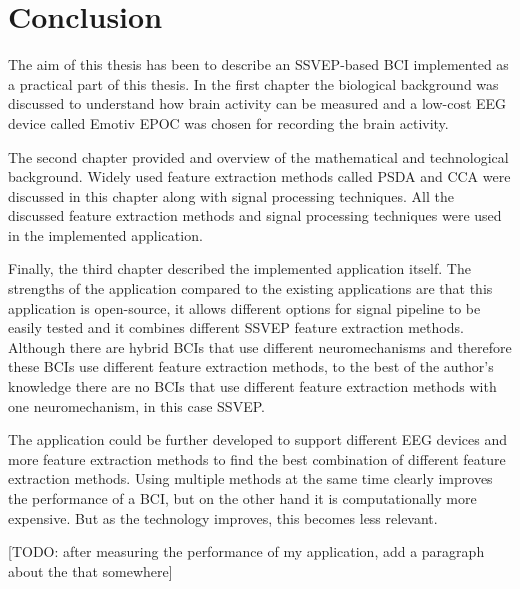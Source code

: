 
\chapter*{Conclusion}

The aim of this thesis has been to describe an \gls{SSVEP}-based \gls{BCI} implemented as a practical part of this thesis. In the first chapter the biological background was discussed to understand how brain activity can be measured and a low-cost \gls{EEG} device called Emotiv EPOC was chosen for recording the brain activity.

The second chapter provided and overview of the mathematical and technological background. Widely used \gls{feature extraction} methods called \gls{PSDA} and \gls{CCA} were discussed in this chapter along with signal processing techniques. All the discussed \gls{feature extraction} methods and signal processing techniques were used in the implemented application.

Finally, the third chapter described the implemented application itself. The strengths of the application compared to the existing applications are that this application is open-source, it allows different options for signal pipeline to be easily tested and it combines different \gls{SSVEP} \gls{feature extraction} methods. Although there are hybrid \glspl{BCI} that use different neuromechanisms and therefore these \glspl{BCI} use different \gls{feature extraction} methods, to the best of the author's knowledge there are no \glspl{BCI} that use different \gls{feature extraction} methods with one neuromechanism, in this case \gls{SSVEP}.

The application could be further developed to support different \gls{EEG} devices and more \gls{feature extraction} methods to find the best combination of different \gls{feature extraction} methods. Using multiple methods at the same time clearly improves the performance of a \gls{BCI}, but on the other hand it is computationally more expensive. But as the technology improves, this becomes less relevant.

[TODO: after measuring the performance of my application, add a paragraph about the that somewhere]
